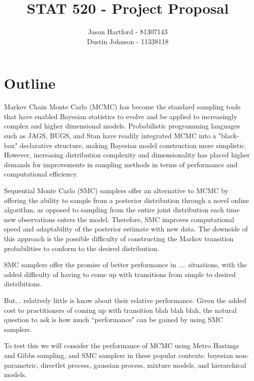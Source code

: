 \documentclass[11pt, oneside]{amsart}
\title{STAT 520 - Project Proposal}
\author{Jason Hartford - 81307143 \\
Dustin Johnson - 11338118}
\begin{document}
\maketitle


\section{Outline}

Markov Chain Monte Carlo (MCMC) has become the standard sampling tools that have enabled Bayesian statistics to evolve and be applied to increasingly complex and higher dimensional models. Probabilistic programming languages such as JAGS, BUGS, and Stan have readily integrated MCMC into a "black-box" declarative structure, making Bayesian model construction more simplistic. However, increasing distribution complexity and dimensionality has placed higher demands for improvements in sampling methods in terms of performance and computational efficiency. 
	
Sequential Monte Carlo (SMC) samplers offer an alternative to MCMC by offering the ability to sample from a posterior distribution through a novel online algorithm, as opposed to sampling from the entire joint distribution each time new observations enters the model. Therefore, SMC improves computational speed and adaptability of the posterior estimate with new data. The downside of this approach is the possible difficulty of constructing the Markov transition probabilities to conform to the desired distribution.


SMC samplers offer the promise of better performance in .... situations, with the added difficulty of having to come up with transitions from simple to desired distribitions.

But... relatively little is know about their relative performance. Given the added cost to practitioners of coming up with transition blah blah blah, the natural question to ask is how much ``performance" can be gained by using SMC samplers.

To test this we will consider the performance of MCMC using Metro Hastings and Gibbs sampling, and SMC samplers in these popular contexts: bayesian non-parametric, directlet process, gaussian process, mixture models, and hierarchical models.

% 
\end{document}
